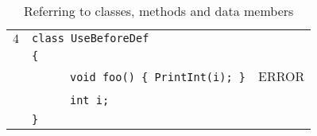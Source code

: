 \documentclass{article}
\begin{document}
\begin{table}[h]
\begin{tabular}{|l|l|l|}
\hline
 $4$ & \verb"class UseBeforeDef"                 &    \\
     & \verb"{"                                  &    \\
     & ~ ~ ~ ~\verb"void foo() { PrintInt(i); }" & ERROR \\
     & ~ ~ ~ ~\verb"int i;"                      &    \\
     & \verb"}"                                  &    \\
\hline
\end{tabular}
\caption{Referring to classes, methods and data members
\label{Table_Code_Examples_Use_Before_Def}}
\end{table}
\end{document}
